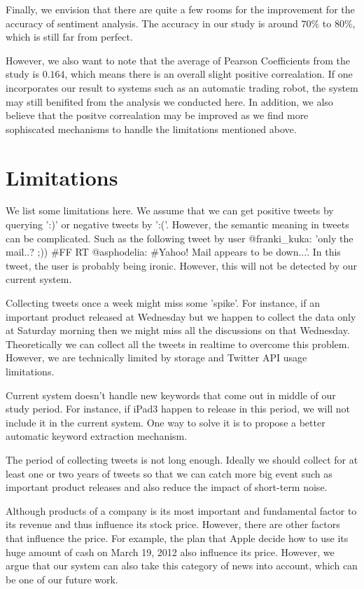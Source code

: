 \documentclass[12pt]{article}
\begin{document}
Finally, we envision that there are quite a few rooms for the improvement for the accuracy of sentiment analysis. The accuracy in our study is around $70\%$ to $80\%$, which is still far from perfect.

However, we also want to note that the average of Pearson Coefficients from the study is $0.164$, which means there is an overall slight positive correalation. If one incorporates our result to systems such as an automatic trading robot, the system may still benifited from the analysis we conducted here. In addition, we also believe that the positve correalation may be improved as we find more sophiscated mechanisms to handle the limitations mentioned above.

\section{Limitations}
We list some limitations here. We assume that we can get positive tweets by querying ':)' or negative tweets by ':('. However, the semantic meaning in tweets can be complicated. Such as the following tweet by user @franki\_kuka: 'only the mail..? ;)) \#FF RT @asphodelia: \#Yahoo! Mail appears to be down...'. In this tweet, the user is probably being ironic. However, this will not be detected by our current system.

Collecting tweets once a week might miss some 'spike'. For instance, if an important product released at Wednesday but we happen to collect the data only at Saturday morning then we might miss all the discussions on that Wednesday. Theoretically we can collect all the tweets in realtime to overcome this problem. However, we are technically limited by storage and Twitter API usage limitations.

Current system doesn't handle new keywords that come out in middle of our study period. For instance, if iPad3 happen to release in this period, we will not include it in the current system. One way to solve it is to propose a better automatic keyword extraction mechanism.

The period of collecting tweets is not long enough. Ideally we should collect for at least one or two years of tweets so that we can catch more big event such as important product releases and also reduce the impact of short-term noise.

Although products of a company is its most important and fundamental factor to its revenue and thus influence its stock price. However, there are other factors that influence the price. For example, the plan that Apple decide how to use its huge amount of cash on March 19, 2012 also influence its price. However, we argue that our system can also take this category of news into account, which can be one of our future work.
\end{document}
